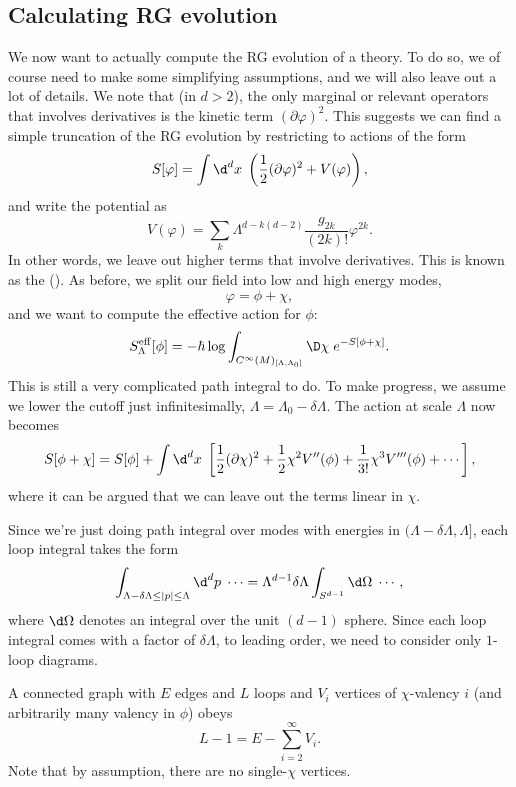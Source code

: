 \documentclass[a4paper]{article}
\begin{document}
\subsection{Calculating RG evolution}
We now want to actually compute the RG evolution of a theory. To do so, we of course need to make some simplifying assumptions, and we will also leave out a lot of details. We note that (in $d > 2$), the only marginal or relevant operators that involves derivatives is the kinetic term $(\partial \varphi)^2$. This suggests we can find a simple truncation of the RG evolution by restricting to actions of the form
\[
  S[\varphi] = \int \d^d x\; \left(\frac{1}{2} (\partial \varphi)^2 + V(\varphi)\right),
\]
and write the potential as
\[
  V(\varphi) = \sum_k\Lambda^{d - k(d - 2)} \frac{g_{2k}}{(2k)!} \varphi^{2k}.
\]
In other words, we leave out higher terms that involve derivatives. This is known as the  (). As before, we split our field into low and high energy modes,
\[
  \varphi = \phi + \chi,
\]
and we want to compute the effective action for $\phi$:
\[
  S_{\Lambda}^{\mathrm{eff}} [\phi] = - \hbar \log \int_{C^\infty(M)_{[\Lambda, \Lambda_0]}} \D \chi\; e^{-S[\phi + \chi]}.
\]
This is still a very complicated path integral to do. To make progress, we assume we lower the cutoff just infinitesimally, $\Lambda = \Lambda_0 - \delta \Lambda$. The action at scale $\Lambda$ now becomes
\[
  S[\phi + \chi] = S[\phi] + \int \d^d x\; \left[\frac{1}{2} (\partial \chi)^2 + \frac{1}{2} \chi^2 V''(\phi) + \frac{1}{3!} \chi^3 V'''(\phi) + \cdots\right],
\]
where it can be argued that we can leave out the terms linear in $\chi$. %

Since we're just doing path integral over modes with energies in $(\Lambda - \delta \Lambda, \Lambda]$, each loop integral takes the form
\[
  \int_{\Lambda - \delta \Lambda \leq |p| \leq \Lambda} \d^d p\; \cdots = \Lambda^{d - 1} \delta \Lambda \int_{S^{d - 1}} \d \Omega\; \cdots,
\]
where $\d \Omega$ denotes an integral over the unit $(d - 1)$ sphere. Since each loop integral comes with a factor of $\delta \Lambda$, to leading order, we need to consider only $1$-loop diagrams.

A connected graph with $E$ edges and $L$ loops and $V_i$ vertices of $\chi$-valency $i$ (and arbitrarily many valency in $\phi$) obeys
\[
  L - 1 = E - \sum_{i = 2}^\infty V_i.
\]
Note that by assumption, there are no single-$\chi$ vertices.
\end{document}
